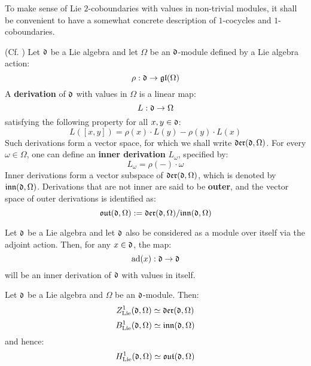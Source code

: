         To make sense of Lie $2$-coboundaries with values in non-trivial modules, it shall be convenient to have a somewhat concrete description of $1$-cocycles and $1$-coboundaries.
        \begin{definition} \label{def: lie_derivations}
            (Cf. \cite[Section VII.2, Equation 2.2, p. 234]{hilton_stammbach_homological_algebra}) Let $\mathfrak{d}$ be a Lie algebra and let $\Omega$ be an $\mathfrak{d}$-module defined by a Lie algebra action:
                $$\rho: \mathfrak{d} \to \mathfrak{gl}(\Omega)$$
            A \textbf{derivation} of $\mathfrak{d}$ with values in $\Omega$ is a linear map:
                $$L: \mathfrak{d} \to \Omega$$
            satisfying the following property for all $x, y \in \mathfrak{d}$:
                $$L( [x, y] ) = \rho(x) \cdot L(y) - \rho(y) \cdot L(x)$$
            Such derivations form a vector space, for which we shall write $\mathfrak{der}(\mathfrak{d}, \Omega)$. For every $\omega \in \Omega$, one can define an \textbf{inner derivation} $L_{\omega}$, specified by:
                $$L_{\omega} = \rho(-) \cdot \omega$$
            Inner derivations form a vector subspace of $\mathfrak{der}(\mathfrak{d}, \Omega)$, which is denoted by $\mathfrak{inn}(\mathfrak{d}, \Omega)$. Derivations that are not inner are said to be \textbf{outer}, and the vector space of outer derivations is identified as:
                $$\mathfrak{out}(\mathfrak{d}, \Omega) := \mathfrak{der}(\mathfrak{d}, \Omega)/\mathfrak{inn}(\mathfrak{d}, \Omega)$$
        \end{definition}
        \begin{example}
            Let $\mathfrak{d}$ be a Lie algebra and let $\mathfrak{d}$ also be considered as a module over itself via the adjoint action. Then, for any $x \in \mathfrak{d}$, the map:
                $$\mathrm{ad}(x): \mathfrak{d} \to \mathfrak{d}$$
            will be an inner derivation of $\mathfrak{d}$ with values in itself.
        \end{example}
        \begin{theorem}
            \cite[Theorem 2.1 and Proposition 2.2]{hilton_stammbach_homological_algebra} Let $\mathfrak{d}$ be a Lie algebra and $\Omega$ be an $\mathfrak{d}$-module. Then:
                $$Z^1_{\mathrm{Lie}}(\mathfrak{d}, \Omega) \simeq \mathfrak{der}(\mathfrak{d}, \Omega)$$
                $$B^1_{\mathrm{Lie}}(\mathfrak{d}, \Omega) \simeq \mathfrak{inn}(\mathfrak{d}, \Omega)$$
            and hence:
                $$H^1_{\mathrm{Lie}}(\mathfrak{d}, \Omega) \simeq \mathfrak{out}(\mathfrak{d}, \Omega)$$
        \end{theorem}
